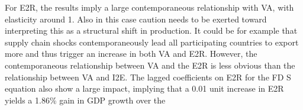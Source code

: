 \documentclass[a4paper]{article}
\begin{document}
For E2R, the results imply a large contemporaneous relationship with VA, with elasticity around 1. Also in this case caution needs to be exerted toward interpreting this as a structural shift in production. It could be for example that supply chain shocks contemporaneously lead all participating countries to export more and thus trigger an increase in both VA and E2R. However, the contemporaneous relationship between VA and the E2R is less obvious than the relationship between VA and I2E. The lagged coefficients on E2R for the FD S equation also show a large impact, implying that a 0.01 unit increase in E2R yields a 1.86\% gain in GDP growth over the 

\begin{table}[h!]
\centering
\caption{\label{tab:VAGRREG} \textsc{Value Added Regressions}}
\end{table}
\end{document}
